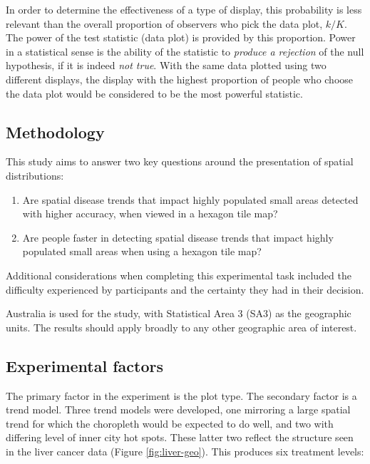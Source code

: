 \documentclass{monashthesis}
\begin{document}
In order to determine the effectiveness of a type of display, this probability is less relevant than the overall proportion of observers who pick the data plot, \(k/K\). The power of the test statistic (data plot) is provided by this proportion. Power in a statistical sense is the ability of the statistic to \emph{produce a rejection} of the null hypothesis, if it is indeed \emph{not true}. With the same data plotted using two different displays, the display with the highest proportion of people who choose the data plot would be considered to be the most powerful statistic.

\hypertarget{methodology}{%
\subsection{Methodology}\label{methodology}}

This study aims to answer two key questions around the presentation of spatial distributions:

\begin{enumerate}
\def\labelenumi{\arabic{enumi}.}
\tightlist
\item
  Are spatial disease trends that impact highly populated small areas detected with higher accuracy, when viewed in a hexagon tile map?
\item
  Are people faster in detecting spatial disease trends that impact highly populated small areas when using a hexagon tile map?
\end{enumerate}

Additional considerations when completing this experimental task included the difficulty experienced by participants and the certainty they had in their decision.

Australia is used for the study, with Statistical Area 3 (SA3) \autocite{abs2016} as the geographic units. The results should apply broadly to any other geographic area of interest.

\hypertarget{experimental-factors}{%
\subsection{Experimental factors}\label{experimental-factors}}

The primary factor in the experiment is the plot type. The secondary factor is a trend model. Three trend models were developed, one mirroring a large spatial trend for which the choropleth would be expected to do well, and two with differing level of inner city hot spots. These latter two reflect the structure seen in the liver cancer data (Figure \ref{fig:liver-geo}). This produces six treatment levels:
\end{document}
